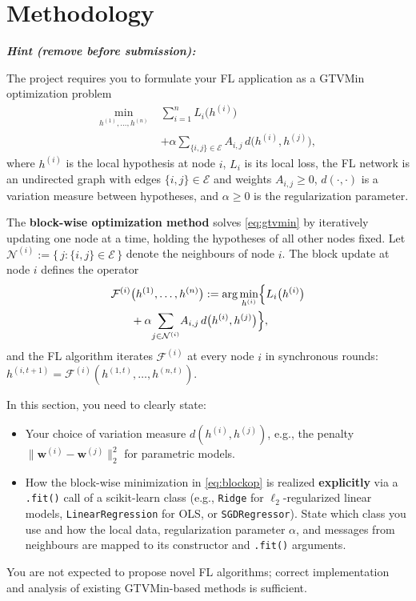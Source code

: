 \documentclass{article}
\providecommand{\defeq}{\mathrel{:=}}
\newenvironment{hint}{%
	\par\medskip\noindent
	\begin{minipage}[t]{\dimexpr\columnwidth-8mm}%
	\raggedright\itshape
	\textbf{Hint (remove before submission):}\space
}{%
	\end{minipage}\par\medskip
}
\begin{document}
\section{Methodology}
\label{sec:meth}
\begin{hint}
The project requires you to formulate your FL application as a GTVMin
optimization problem
\begin{equation}
\begin{aligned}
\min_{h^{(1)},\ldots,h^{(n)}}\;
& \sum_{i=1}^{n} L_{i}\bigl(h^{(i)}\bigr) \\
& + \alpha\!\sum_{\{i,j\}\in\mathcal{E}}\!
A_{i,j}\, d\bigl(h^{(i)},h^{(j)}\bigr),
\end{aligned}
\label{eq:gtvmin}
\end{equation}
where $h^{(i)}$ is the local hypothesis at node $i$, $L_{i}$ is its local
loss, the FL network is an undirected graph with edges
$\{i,j\}\in\mathcal{E}$ and weights $A_{i,j} \geq 0$,
$d(\cdot,\cdot)$ is a variation measure between hypotheses,
and $\alpha \geq 0$ is the regularization parameter.

The \textbf{block-wise optimization method} solves \eqref{eq:gtvmin} by
iteratively updating one node at a time, holding the hypotheses of all
other nodes fixed. Let
$\mathcal{N}^{(i)} \defeq \{\, j : \{i,j\}\in\mathcal{E}\,\}$ denote the
neighbours of node $i$. The block update at node $i$ defines the operator
\begin{equation}
\begin{aligned}
\mathcal{F}^{(i)}&\bigl(h^{(1)},\ldots,h^{(n)}\bigr) \defeq \arg\min_{h^{(i)}} \Bigl\{ L_{i}\bigl(h^{(i)}\bigr) \\
&+ \alpha\!\sum_{j \in \mathcal{N}^{(i)}}\!
A_{i,j}\, d\bigl(h^{(i)},h^{(j)}\bigr) \Bigr\},
\end{aligned}
\label{eq:blockop}
\end{equation}
and the FL algorithm iterates $\mathcal{F}^{(i)}$ at every node $i$ in
synchronous rounds:
$h^{(i,t+1)} = \mathcal{F}^{(i)}(h^{(1,t)},\ldots,h^{(n,t)})$.

In this section, you need to clearly state:
\begin{itemize}
	\item Your choice of variation measure $d(h^{(i)}, h^{(j)})$, e.g.,
	the penalty $\big\|\mathbf{w}^{(i)} - \mathbf{w}^{(j)}\big\|_2^2$ for parametric models.
	\item How the block-wise minimization in \eqref{eq:blockop} is realized
	\textbf{explicitly} via a \texttt{.fit()} call of a scikit-learn class
	(e.g., \texttt{Ridge} for $\ell_2$-regularized linear models,
	\texttt{LinearRegression} for OLS, or \texttt{SGDRegressor}).
	State which class you use and how the local data, regularization
	parameter $\alpha$, and messages from neighbours are mapped to its
	constructor and \texttt{.fit()} arguments.
\end{itemize}
You are not expected to propose novel FL algorithms; correct implementation and
analysis of existing GTVMin-based methods is sufficient.
\end{hint}
\end{document}
